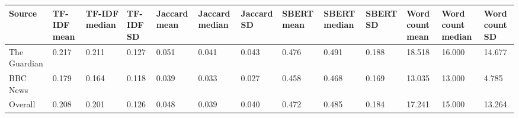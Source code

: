 \begin{tabular}{lllllllllllll}
\toprule
Source & TF-IDF mean & TF-IDF median & TF-IDF SD & Jaccard mean & Jaccard median & Jaccard SD & SBERT mean & SBERT median & SBERT SD & Word count mean & Word count median & Word count SD \\
\midrule
The Guardian & 0.217 & 0.211 & 0.127 & 0.051 & 0.041 & 0.043 & 0.476 & 0.491 & 0.188 & 18.518 & 16.000 & 14.677 \\
BBC News & 0.179 & 0.164 & 0.118 & 0.039 & 0.033 & 0.027 & 0.458 & 0.468 & 0.169 & 13.035 & 13.000 & 4.785 \\
Overall & 0.208 & 0.201 & 0.126 & 0.048 & 0.039 & 0.040 & 0.472 & 0.485 & 0.184 & 17.241 & 15.000 & 13.264 \\
\bottomrule
\end{tabular}
